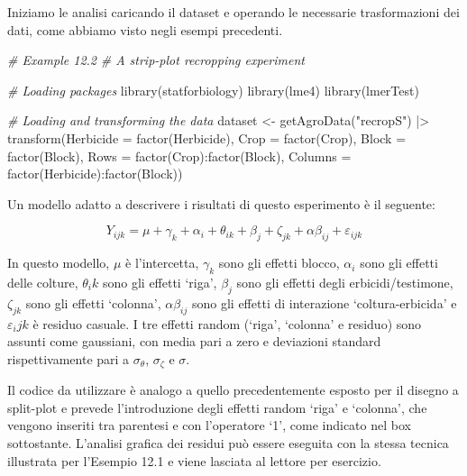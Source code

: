 \documentclass[
  12pt,
]{book}
\newenvironment{Shaded}{\begin{snugshade}}{\end{snugshade}}
\newcommand{\AttributeTok}[1]{\textcolor[rgb]{0.77,0.63,0.00}{#1}}
\newcommand{\CommentTok}[1]{\textcolor[rgb]{0.56,0.35,0.01}{\textit{#1}}}
\newcommand{\FunctionTok}[1]{\textcolor[rgb]{0.00,0.00,0.00}{#1}}
\newcommand{\NormalTok}[1]{#1}
\newcommand{\OtherTok}[1]{\textcolor[rgb]{0.56,0.35,0.01}{#1}}
\newcommand{\SpecialCharTok}[1]{\textcolor[rgb]{0.00,0.00,0.00}{#1}}
\newcommand{\StringTok}[1]{\textcolor[rgb]{0.31,0.60,0.02}{#1}}
\begin{document}
Iniziamo le analisi caricando il dataset e operando le necessarie trasformazioni dei dati, come abbiamo visto negli esempi precedenti.

\begin{Shaded}
\begin{Highlighting}[]
\CommentTok{\# Example 12.2}
\CommentTok{\# A strip{-}plot recropping experiment}

\CommentTok{\# Loading packages}
\FunctionTok{library}\NormalTok{(statforbiology)}
\FunctionTok{library}\NormalTok{(lme4)}
\FunctionTok{library}\NormalTok{(lmerTest)}

\CommentTok{\# Loading and transforming the data}
\NormalTok{dataset }\OtherTok{\textless{}{-}} \FunctionTok{getAgroData}\NormalTok{(}\StringTok{"recropS"}\NormalTok{) }\SpecialCharTok{|\textgreater{}}
  \FunctionTok{transform}\NormalTok{(}\AttributeTok{Herbicide =} \FunctionTok{factor}\NormalTok{(Herbicide),}
            \AttributeTok{Crop =} \FunctionTok{factor}\NormalTok{(Crop),}
            \AttributeTok{Block =} \FunctionTok{factor}\NormalTok{(Block),}
            \AttributeTok{Rows =} \FunctionTok{factor}\NormalTok{(Crop)}\SpecialCharTok{:}\FunctionTok{factor}\NormalTok{(Block),}
            \AttributeTok{Columns =} \FunctionTok{factor}\NormalTok{(Herbicide)}\SpecialCharTok{:}\FunctionTok{factor}\NormalTok{(Block))}
\end{Highlighting}
\end{Shaded}

Un modello adatto a descrivere i risultati di questo esperimento è il seguente:

\[Y_{ijk} = \mu + \gamma_k + \alpha_i + \theta_{ik} + \beta_j + \zeta_{jk} + \alpha\beta_{ij} + \varepsilon_{ijk}\]

In questo modello, \(\mu\) è l'intercetta, \(\gamma_k\) sono gli effetti blocco, \(\alpha_i\) sono gli effetti delle colture, \(\theta_ik\) sono gli effetti `riga', \(\beta_j\) sono gli effetti degli erbicidi/testimone, \(\zeta_{jk}\) sono gli effetti `colonna', \(\alpha\beta_{ij}\) sono gli effetti di interazione `coltura-erbicida' e \(\varepsilon_ijk\) è residuo casuale. I tre effetti random (`riga', `colonna' e residuo) sono assunti come gaussiani, con media pari a zero e deviazioni standard rispettivamente pari a \(\sigma_{\theta}\), \(\sigma_{\zeta}\) e \(\sigma\).

Il codice da utilizzare è analogo a quello precedentemente esposto per il disegno a split-plot e prevede l'introduzione degli effetti random `riga' e `colonna', che vengono inseriti tra parentesi e con l'operatore `1\textbar{}', come indicato nel box sottostante. L'analisi grafica dei residui può essere eseguita con la stessa tecnica illustrata per l'Esempio 12.1 e viene lasciata al lettore per esercizio.
\end{document}

